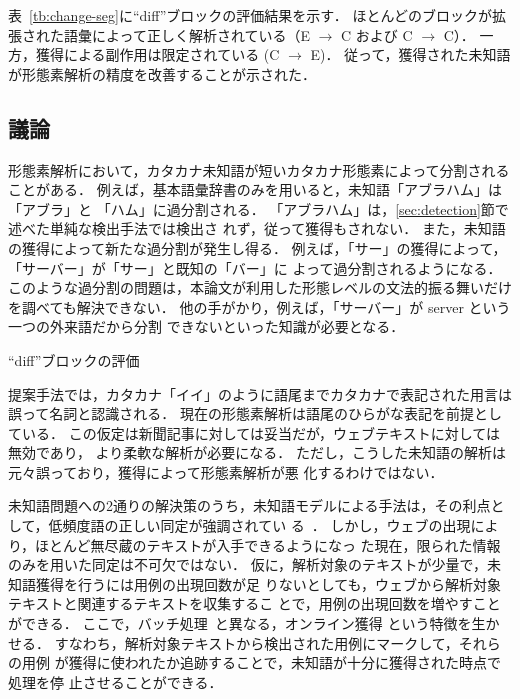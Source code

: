 \documentclass[japanese]{jnlp_1.4}
\begin{document}
表~\ref{tb:change-seg}に``diff''ブロックの評価結果を示す．
ほとんどのブロックが拡張された語彙によって正しく解析されている（E
$\rightarrow$ C  および  C $\rightarrow$ C）．
一方，獲得による副作用は限定されている (C $\rightarrow$ E)．
従って，獲得された未知語が形態素解析の精度を改善することが示された．



\subsection{議論} \label{sec:experiments-discussion}

形態素解析において，カタカナ未知語が短いカタカナ形態素によって分割される
ことがある．
例えば，基本語彙辞書のみを用いると，未知語「アブラハム」は「アブラ」と
「ハム」に過分割される．
「アブラハム」は，\ref{sec:detection}節で述べた単純な検出手法では検出さ
れず，従って獲得もされない．
また，未知語の獲得によって新たな過分割が発生し得る．
例えば，「サー」の獲得によって，「サーバー」が「サー」と既知の「バー」に
よって過分割されるようになる．
このような過分割の問題は，本論文が利用した形態レベルの文法的振る舞いだけ
を調べても解決できない．
他の手がかり，例えば，「サーバー」が server という一つの外来語だから分割
できないといった知識が必要となる．

\begin{table}[t]
\caption{``diff''ブロックの評価}
\label{tb:change-seg}

\vspace{-1\baselineskip}
\end{table}

提案手法では，カタカナ「イイ」のように語尾までカタカナで表記された用言は
誤って名詞と認識される．
現在の形態素解析は語尾のひらがな表記を前提としている．
この仮定は新聞記事に対しては妥当だが，ウェブテキストに対しては無効であり，
より柔軟な解析が必要になる．
ただし，こうした未知語の解析は元々誤っており，獲得によって形態素解析が悪
化するわけではない．

未知語問題への2通りの解決策のうち，未知語モデルによる手法は，その利点と
して，低頻度語の正しい同定が強調されてい
る~\cite{Nagata1999full,Asahara2004full}．
しかし，ウェブの出現により，ほとんど無尽蔵のテキストが入手できるようになっ
た現在，限られた情報のみを用いた同定は不可欠ではない．
仮に，解析対象のテキストが少量で，未知語獲得を行うには用例の出現回数が足
りないとしても，ウェブから解析対象テキストと関連するテキストを収集するこ
とで，用例の出現回数を増やすことができる．
ここで，バッチ処理~\cite{Mori1996full}と異なる，オンライン獲得
という特徴を生かせる．
すなわち，解析対象テキストから検出された用例にマークして，それらの用例
が獲得に使われたか追跡することで，未知語が十分に獲得された時点で処理を停
止させることができる．
\end{document}
